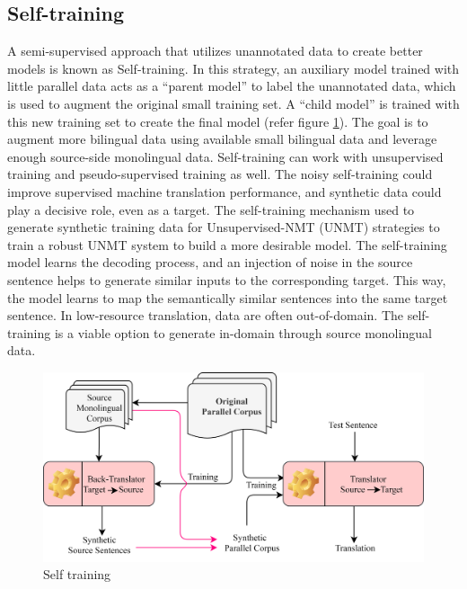 \documentclass[manuscript,screen]{acmart}
\begin{document}
\subsection{Self-training}
A semi-supervised approach that utilizes unannotated data to create better models is known as Self-training. In this strategy, an auxiliary model trained with little parallel data acts as a ``parent model'' to label the unannotated data, which is used to augment the original small training set. A ``child model'' is trained with this new training set to create the final model (refer figure \ref{self-training}). The goal is to augment more bilingual data using available small bilingual data and leverage enough source-side monolingual data. Self-training can work with unsupervised training and pseudo-supervised training as well. The noisy self-training could improve supervised machine translation performance, and synthetic data could play a decisive role, even as a target. The self-training mechanism used to generate synthetic training data for Unsupervised-NMT (UNMT) strategies to train a robust UNMT system to build a more desirable model. The self-training model learns the decoding process, and an injection of noise in the source sentence helps to generate similar inputs to the corresponding target. This way, the model learns to map the semantically similar sentences into the same target sentence. In low-resource translation, data are often out-of-domain. The self-training is a viable option to generate in-domain through source monolingual data.

\begin{figure}[!h]
    \centering
    \includegraphics[width=0.9\linewidth]{selfLearning.png}
    \caption{Self training}
    \label{self-training}
\end{figure}
\end{document}
